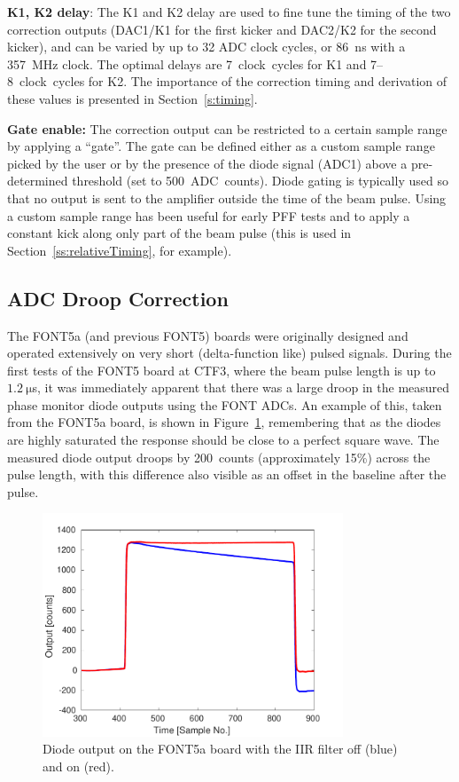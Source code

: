 \textbf{K1, K2 delay}: The K1 and K2 delay are used to fine tune the timing of the two correction outputs (DAC1/K1 for the first kicker and DAC2/K2 for the second kicker), and can be varied by up to 32 ADC clock cycles, or 86~ns with a 357~MHz clock. The optimal delays are 7~clock~cycles for K1 and 7--8~clock~cycles for K2. The importance of the correction timing and derivation of these values is presented in Section~\ref{s:timing}.

\textbf{Gate enable:} The correction output can be restricted to a certain sample range by applying a ``gate''. The gate can be defined either as a custom sample range picked by the user or by the presence of the diode signal (ADC1) above a pre-determined threshold (set to 500~ADC~counts). Diode gating is typically used so that no output is sent to the amplifier outside the time of the beam pulse. Using a custom sample range has been useful for early PFF tests and to apply a constant kick along only part of the beam pulse (this is used in Section~\ref{ss:relativeTiming}, for example).


\subsection{ADC Droop Correction}
\label{ss:droopCorr}

The FONT5a (and previous FONT5) boards were originally designed and operated extensively on very short (delta-function like) pulsed signals.
During the first tests of the FONT5 board at CTF3, where the beam pulse length is up to \(1.2~\mathrm{\mu}\)s, it was immediately apparent that there was a large droop in the measured phase monitor diode outputs using the FONT ADCs. An example of this, taken from the FONT5a board, is shown in Figure~\ref{f:iirDiodefiltOffOn}, remembering that as the diodes are highly saturated the response should be close to a perfect square wave. The measured diode output droops by 200~counts (approximately 15\%) across the pulse length, with this difference also visible as an offset in the baseline after the pulse.

\begin{figure}
  \centering
  \includegraphics[width=0.8\textwidth]{Figures/commissioning/iirDiodeFiltOffOn}
  \caption{Diode output on the FONT5a board with the IIR filter off (blue) and on (red).}
  \label{f:iirDiodefiltOffOn}
\end{figure}


